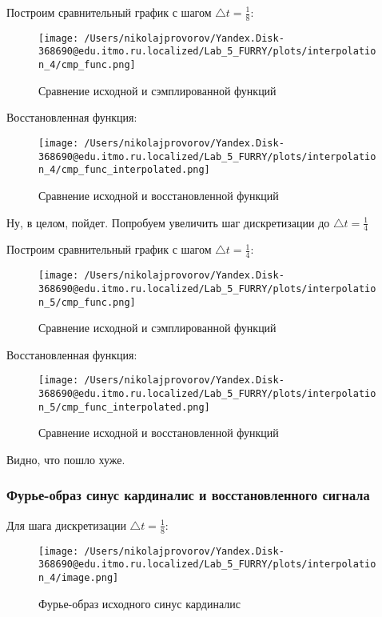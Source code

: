 Построим сравнительный график с шагом $\triangle t = \frac{1}{8}$:

\begin{figure}[ht!]
    \centering
    \texttt{[image: /Users/nikolajprovorov/Yandex.Disk-368690@edu.itmo.ru.localized/Lab\_5\_FURRY/plots/interpolation\_4/cmp\_func.png]}
    \caption{Сравнение исходной и сэмплированной функций}
\end{figure}

Восстановленная функция:

\begin{figure}[ht!]
    \centering
    \texttt{[image: /Users/nikolajprovorov/Yandex.Disk-368690@edu.itmo.ru.localized/Lab\_5\_FURRY/plots/interpolation\_4/cmp\_func\_interpolated.png]}
    \caption{Сравнение исходной и восстановленной функций}
\end{figure}

Ну, в целом, пойдет. Попробуем увеличить шаг дискретизации до $\triangle t = \frac{1}{4}$

\clearpage

Построим сравнительный график с шагом $\triangle t = \frac{1}{4}$:

\begin{figure}[ht!]
    \centering
    \texttt{[image: /Users/nikolajprovorov/Yandex.Disk-368690@edu.itmo.ru.localized/Lab\_5\_FURRY/plots/interpolation\_5/cmp\_func.png]}
    \caption{Сравнение исходной и сэмплированной функций}
\end{figure}

Восстановленная функция:

\begin{figure}[ht!]
    \centering
    \texttt{[image: /Users/nikolajprovorov/Yandex.Disk-368690@edu.itmo.ru.localized/Lab\_5\_FURRY/plots/interpolation\_5/cmp\_func\_interpolated.png]}
    \caption{Сравнение исходной и восстановленной функций}
\end{figure}

Видно, что пошло хуже.

\clearpage

\subsubsection{Фурье-образ синус кардиналис и восстановленного сигнала}

Для шага дискретизации $\triangle t = \frac{1}{8}$:

\begin{figure}[ht!]
    \centering
    \texttt{[image: /Users/nikolajprovorov/Yandex.Disk-368690@edu.itmo.ru.localized/Lab\_5\_FURRY/plots/interpolation\_4/image.png]}
    \caption{Фурье-образ исходного синус кардиналис}
\end{figure}

